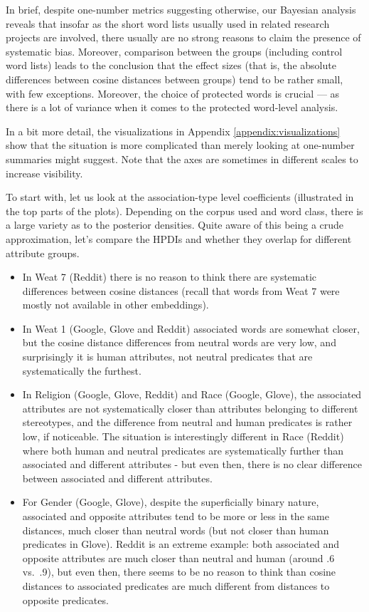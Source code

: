 \documentclass[
  10pt,
  dvipsnames,enabledeprecatedfontcommands]{scrartcl}
\begin{document}
In brief, despite one-number metrics suggesting otherwise, our Bayesian
analysis reveals that insofar as the short word lists usually used in
related research projects are involved, there usually are no strong
reasons to claim the presence of systematic bias. Moreover, comparison
between the groups (including control word lists) leads to the
conclusion that the effect sizes (that is, the absolute differences
between cosine distances between groups) tend to be rather small, with
few exceptions. Moreover, the choice of protected words is crucial ---
as there is a lot of variance when it comes to the protected word-level
analysis.

In a bit more detail, the visualizations in Appendix
\ref{appendix:visualizations} show that the situation is more
complicated than merely looking at one-number summaries might suggest.
Note that the axes are sometimes in different scales to increase
visibility.

To start with, let us look at the association-type level coefficients
(illustrated in the top parts of the plots). Depending on the corpus
used and word class, there is a large variety as to the posterior
densities. Quite aware of this being a crude approximation, let's
compare the HPDIs and whether they overlap for different attribute
groups.

\begin{itemize}
\item
  In Weat 7 (Reddit) there is no reason to think there are systematic
  differences between cosine distances (recall that words from Weat 7
  were mostly not available in other embeddings).
\item
  In Weat 1 (Google, Glove and Reddit) associated words are somewhat
  closer, but the cosine distance differences from neutral words are
  very low, and surprisingly it is human attributes, not neutral
  predicates that are systematically the furthest.
\item
  In Religion (Google, Glove, Reddit) and Race (Google, Glove), the
  associated attributes are not systematically closer than attributes
  belonging to different stereotypes, and the difference from neutral
  and human predicates is rather low, if noticeable. The situation is
  interestingly different in Race (Reddit) where both human and neutral
  predicates are systematically further than associated and different
  attributes - but even then, there is no clear difference between
  associated and different attributes.
\item
  For Gender (Google, Glove), despite the superficially binary nature,
  associated and opposite attributes tend to be more or less in the same
  distances, much closer than neutral words (but not closer than human
  predicates in Glove). Reddit is an extreme example: both associated
  and opposite attributes are much closer than neutral and human (around
  .6 vs.~.9), but even then, there seems to be no reason to think than
  cosine distances to associated predicates are much different from
  distances to opposite predicates.
\end{itemize}
\end{document}
